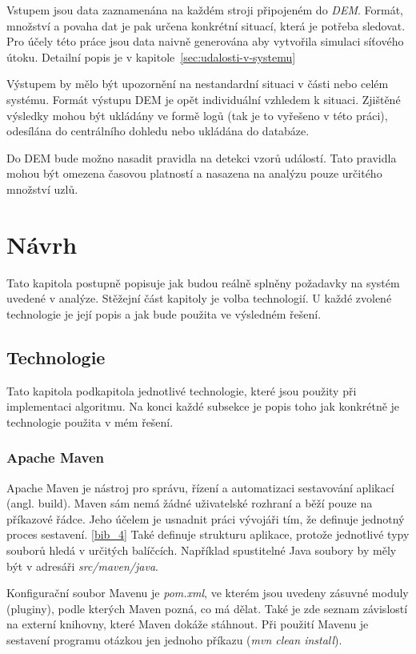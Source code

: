 \documentclass[
  digital, %
  table,   %
  nolof,     %
  nolot,     %
  oneside, %
  nocover,
  monochrome,
  12pt
]{fithesis3}
\begin{document}
Vstupem jsou data zaznamenána na každém stroji připojeném do \textit{DEM}. Formát, množství a povaha dat je pak určena konkrétní situací, která je potřeba sledovat. Pro účely této práce jsou data naivně generována aby vytvořila simulaci síťového útoku. Detailní popis je v kapitole~\ref{sec:udalosti-v-systemu}

Výstupem by mělo být upozornění na nestandardní situaci v části nebo celém systému. Formát výstupu DEM je opět individuální vzhledem k situaci. Zjištěné výsledky mohou být ukládány ve formě logů (tak je to vyřešeno v této práci), odesílána do centrálního dohledu nebo ukládána do databáze.

Do DEM bude možno nasadit pravidla na detekci vzorů událostí. Tato pravidla mohou být omezena časovou platností a nasazena na analýzu pouze určitého množství uzlů.
\chapter{Návrh}
Tato kapitola postupně popisuje jak budou reálně splněny požadavky na systém uvedené v analýze. Stěžejní část kapitoly je volba technologií. U každé zvolené technologie je její popis a jak bude použita ve výsledném řešení.

\section{Technologie}
Tato kapitola podkapitola jednotlivé technologie, které jsou použity při implementaci algoritmu. Na konci každé subsekce je popis toho jak konkrétně je technologie použita v mém řešení.

\subsection{Apache Maven}
Apache Maven je nástroj pro správu, řízení a automatizaci sestavování aplikací (angl. build). Maven sám nemá žádné uživatelské rozhraní a běží pouze na příkazové řádce. Jeho účelem je usnadnit práci vývojáři tím, že definuje jednotný proces sestavení. \ref{bib_4} Také definuje strukturu aplikace, protože jednotlivé typy souborů hledá v určitých balíčcích. Například spustitelné Java soubory by měly být v adresáři \textit{src/maven/java}.

Konfigurační soubor Mavenu je \textit{pom.xml}, ve kterém jsou uvedeny zásuvné moduly (pluginy), podle kterých Maven pozná, co má dělat. Také je zde seznam závislostí na externí knihovny, které Maven dokáže stáhnout. Při použití Mavenu je sestavení programu otázkou jen jednoho příkazu (\textit{mvn clean install}).
\end{document}
